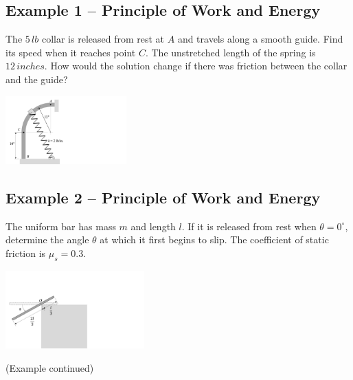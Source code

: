 \documentclass[12pt,letterpaper,twoside]{report}
\begin{document}
\subsection{Example 1 – Principle of Work and Energy}
The $5 \, lb$ collar is released from rest at $A$ and travels along a smooth guide.  Find its speed when it reaches point $C$.  The unstretched length of the spring is $12 \, inches$.  How would the solution change if there was friction between the collar and the guide?

 \includegraphics[trim={1cm 0cm 18cm 1cm},clip,width=0.35\textwidth, left]{Slide71}

\vspace*{10\baselineskip}
\newpage

\subsection{Example 2 – Principle of Work and Energy}

The uniform bar has mass $m$ and length $l$.  If it is released from rest when $\theta = 0^{\circ}$, determine the angle $\theta$ at which it first begins to slip.  The coefficient of static friction is $\mu_s = 0.3$.  

\includegraphics[trim={0cm 2cm 18cm 6cm},clip,width=0.4\textwidth, left]{Slide72}

\vspace*{10\baselineskip}
\newpage

(Example continued)

\newpage
\end{document}
